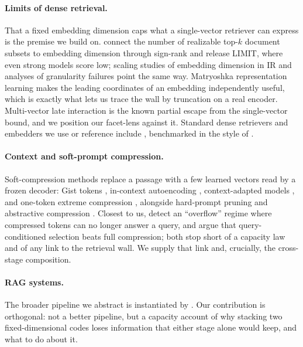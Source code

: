 \documentclass{article}
\begin{document}
\paragraph{Limits of dense retrieval.} That a fixed embedding dimension caps what a single-vector
retriever can express is the premise we build on. \citet{weller2025limit} connect the number of
realizable top-$k$ document subsets to embedding dimension through sign-rank
\citep{razborov2010signrank,forster2002linear} and release LIMIT, where even strong models score
low; scaling studies of embedding dimension in IR and analyses of granularity failures point the
same way. Matryoshka representation learning \citep{kusupati2022matryoshka} makes the leading
coordinates of an embedding independently useful, which is exactly what lets us trace the wall by
truncation on a real encoder. Multi-vector late interaction \citep{khattab2020colbert,
santhanam2022colbertv2} is the known partial escape from the single-vector bound, and we position
our facet-lens against it. Standard dense retrievers and embedders we use or reference include
\citet{reimers2019sbert,karpukhin2020dpr,izacard2022contriever,wang2022e5,li2023gte,xiao2023bge,
merrick2024arctic,ni2022gtr}, benchmarked in the style of \citet{thakur2021beir,muennighoff2023mteb}.

\paragraph{Context and soft-prompt compression.} Soft-compression methods replace a passage with a
few learned vectors read by a frozen decoder: Gist tokens \citep{mu2023gist}, in-context
autoencoding \citep{ge2023icae}, context-adapted models \citep{chevalier2023autocompressor}, and
one-token extreme compression \citep{cheng2024xrag}, alongside hard-prompt pruning
\citep{jiang2023llmlingua,jiang2023longllmlingua,pan2024llmlingua2,li2023selective} and abstractive
compression \citep{xu2024recomp,li2024500x}. Closest to us, \citet{belikova2026overflow} detect an
``overflow'' regime where compressed tokens can no longer answer a query, and \citet{selecom2026}
argue that query-conditioned selection beats full compression; both stop short of a capacity law
and of any link to the retrieval wall. We supply that link and, crucially, the cross-stage
composition.

\paragraph{RAG systems.} The broader pipeline we abstract is instantiated by
\citet{lewis2020rag,guu2020realm,borgeaud2022retro,izacard2023atlas,izacard2021fid,ram2023ralm,
shi2024replug,asai2024selfrag}. Our contribution is orthogonal: not a better pipeline, but a
capacity account of why stacking two fixed-dimensional codes loses information that either stage
alone would keep, and what to do about it.
\end{document}
